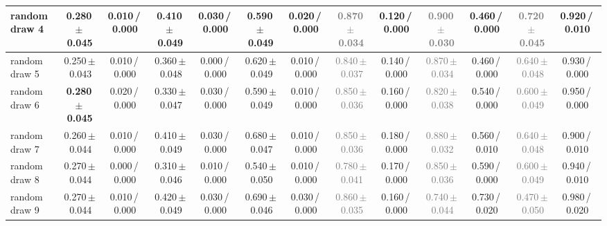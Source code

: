 \begin{tabular}{@{}lcccccccccccc@{}}
random draw 4 & \textbf{0.280\,{\scriptsize$\pm$\,0.045}} & {\scriptsize 0.010\,/\,0.000} & 0.410\,{\scriptsize$\pm$\,0.049} & {\scriptsize 0.030\,/\,0.000} & 0.590\,{\scriptsize$\pm$\,0.049} & {\scriptsize 0.020\,/\,0.000} & \textcolor{gray}{0.870\,{\scriptsize$\pm$\,0.034}} & {\scriptsize 0.120\,/\,0.000} & \textcolor{gray}{0.900\,{\scriptsize$\pm$\,0.030}} & {\scriptsize 0.460\,/\,0.000} & \textcolor{gray}{0.720\,{\scriptsize$\pm$\,0.045}} & {\scriptsize 0.920\,/\,0.010} \\
\midrule
random draw 5 & 0.250\,{\scriptsize$\pm$\,0.043} & {\scriptsize 0.010\,/\,0.000} & 0.360\,{\scriptsize$\pm$\,0.048} & {\scriptsize 0.000\,/\,0.000} & 0.620\,{\scriptsize$\pm$\,0.049} & {\scriptsize 0.010\,/\,0.000} & \textcolor{gray}{0.840\,{\scriptsize$\pm$\,0.037}} & {\scriptsize 0.140\,/\,0.000} & \textcolor{gray}{0.870\,{\scriptsize$\pm$\,0.034}} & {\scriptsize 0.460\,/\,0.000} & \textcolor{gray}{0.640\,{\scriptsize$\pm$\,0.048}} & {\scriptsize 0.930\,/\,0.000} \\
random draw 6 & \textbf{0.280\,{\scriptsize$\pm$\,0.045}} & {\scriptsize 0.020\,/\,0.000} & 0.330\,{\scriptsize$\pm$\,0.047} & {\scriptsize 0.030\,/\,0.000} & 0.590\,{\scriptsize$\pm$\,0.049} & {\scriptsize 0.010\,/\,0.000} & \textcolor{gray}{0.850\,{\scriptsize$\pm$\,0.036}} & {\scriptsize 0.160\,/\,0.000} & \textcolor{gray}{0.820\,{\scriptsize$\pm$\,0.038}} & {\scriptsize 0.540\,/\,0.000} & \textcolor{gray}{0.600\,{\scriptsize$\pm$\,0.049}} & {\scriptsize 0.950\,/\,0.000} \\
random draw 7 & 0.260\,{\scriptsize$\pm$\,0.044} & {\scriptsize 0.010\,/\,0.000} & 0.410\,{\scriptsize$\pm$\,0.049} & {\scriptsize 0.030\,/\,0.000} & 0.680\,{\scriptsize$\pm$\,0.047} & {\scriptsize 0.010\,/\,0.000} & \textcolor{gray}{0.850\,{\scriptsize$\pm$\,0.036}} & {\scriptsize 0.180\,/\,0.000} & \textcolor{gray}{0.880\,{\scriptsize$\pm$\,0.032}} & {\scriptsize 0.560\,/\,0.010} & \textcolor{gray}{0.640\,{\scriptsize$\pm$\,0.048}} & {\scriptsize 0.900\,/\,0.010} \\
random draw 8 & 0.270\,{\scriptsize$\pm$\,0.044} & {\scriptsize 0.000\,/\,0.000} & 0.310\,{\scriptsize$\pm$\,0.046} & {\scriptsize 0.010\,/\,0.000} & 0.540\,{\scriptsize$\pm$\,0.050} & {\scriptsize 0.010\,/\,0.000} & \textcolor{gray}{0.780\,{\scriptsize$\pm$\,0.041}} & {\scriptsize 0.170\,/\,0.000} & \textcolor{gray}{0.850\,{\scriptsize$\pm$\,0.036}} & {\scriptsize 0.590\,/\,0.000} & \textcolor{gray}{0.600\,{\scriptsize$\pm$\,0.049}} & {\scriptsize 0.940\,/\,0.010} \\
random draw 9 & 0.270\,{\scriptsize$\pm$\,0.044} & {\scriptsize 0.010\,/\,0.000} & 0.420\,{\scriptsize$\pm$\,0.049} & {\scriptsize 0.030\,/\,0.000} & 0.690\,{\scriptsize$\pm$\,0.046} & {\scriptsize 0.030\,/\,0.000} & \textcolor{gray}{0.860\,{\scriptsize$\pm$\,0.035}} & {\scriptsize 0.160\,/\,0.000} & \textcolor{gray}{0.740\,{\scriptsize$\pm$\,0.044}} & {\scriptsize 0.730\,/\,0.020} & \textcolor{gray}{0.470\,{\scriptsize$\pm$\,0.050}} & {\scriptsize 0.980\,/\,0.020} \\

\end{tabular}
